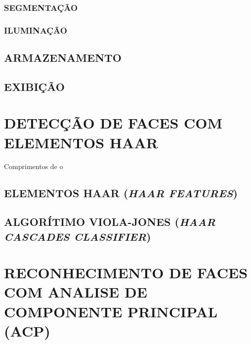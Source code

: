 \subsubsection{SEGMENTAÇÃO}\label{subsubsec:segmentacao}

\subsubsection{ILUMINAÇÃO}\label{subsubsec:iluminacao}

\subsection{ARMAZENAMENTO}\label{subsubsec:armazenamento}

\subsection{EXIBIÇÃO}\label{subsubsec:exibicao}




\section{DETECÇÃO DE FACES COM ELEMENTOS HAAR}\label{sec:detecao_faces}

Comprimentos de o


\subsection{ELEMENTOS HAAR (\textit{HAAR FEATURES}) }\label{subsubsec:elem_haar}


\subsection{ALGORÍTIMO VIOLA-JONES (\textit{HAAR CASCADES CLASSIFIER}) }\label{subsubsec:violajones}




\section{RECONHECIMENTO DE FACES COM ANALISE DE COMPONENTE PRINCIPAL (ACP) }\label{sec:recog_faces}


